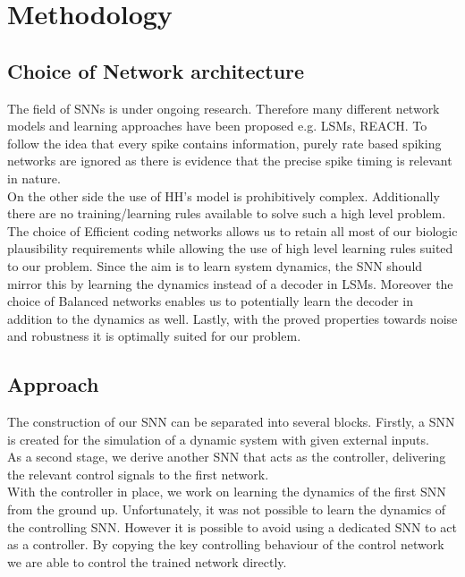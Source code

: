 \chapter{Methodology}




\section{Choice of Network architecture}

The field of \acp{SNN} is under ongoing research. Therefore many different network models and learning approaches have been proposed e.g. \acp{LSM}, REACH\cite{dewolf_spiking_2016}. To follow the idea that every spike contains information, purely rate based spiking networks are ignored as there is evidence that the precise spike timing is relevant in nature\cite{brette_philosophy_2015,putney_precise_2019}.\\

On the other side the use of \ac{HH}'s model is prohibitively complex. Additionally there are no training/learning rules available to solve such a high level problem.\\
The choice of Efficient coding networks allows us to retain all most of our biologic plausibility requirements while allowing the use of high level learning rules suited to our problem. Since the aim is to learn system dynamics, the \ac{SNN} should mirror this by learning the dynamics instead of a decoder in \acp{LSM}. Moreover the choice of Balanced networks enables us to potentially learn the decoder in addition to the dynamics as well. Lastly, with the proved properties towards noise and robustness it is optimally suited for our problem.
\section{Approach}
The construction of our \ac{SNN} can be separated into several blocks. Firstly, a \ac{SNN} is created for the simulation of a dynamic system with given external inputs.\\
As a second stage, we derive another \ac{SNN} that acts as the controller, delivering the relevant control signals to the first network.\\
With the controller in place, we work on learning the dynamics of the first \ac{SNN} from the ground up. Unfortunately, it was not possible to learn the dynamics of the controlling \ac{SNN}. However it is possible to avoid using a dedicated \ac{SNN} to act as a controller. By copying the key controlling behaviour of the control network we are able to control the trained network directly.\\
